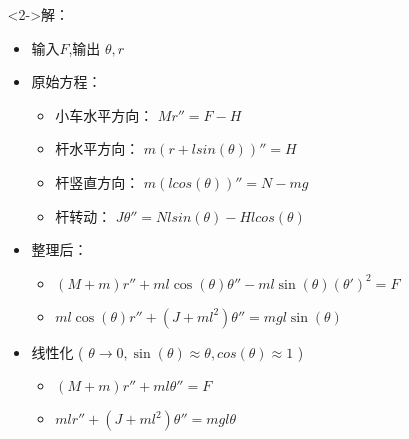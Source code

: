 \documentclass{beamer}
\begin{document}
\begin{frame}[t]
\begin{columns}
\begin{column}{0.23\textwidth}
\begin{block}
\end{block}
\end{column}
\begin{column}{0.77\textwidth}
\begin{block}<2->{解：}
\label{sec-5-1-2}


\begin{itemize}
\item 输入$F$,输出 $\theta,r$
\item 原始方程：
\begin{itemize}
\item 小车水平方向： $Mr''=F-H$
\item 杆水平方向： $m(r+l sin(\theta))'' = H$
\item 杆竖直方向： $m (l cos(\theta))'' = N-mg$
\item 杆转动： $J\theta''=N l sin(\theta) - H l cos(\theta)$
\end{itemize}
\item 整理后：
\begin{itemize}
\item $(M+m)r''+ml\cos(\theta)\theta''-ml\sin(\theta)(\theta')^2=F$
\item $ml\cos(\theta)r''+(J+m l^2)\theta''=mgl\sin(\theta)$
\end{itemize}
\item 线性化 ( $\theta\rightarrow 0,\sin(\theta)\approx \theta,cos(\theta)\approx 1$ )
\begin{itemize}
\item $(M+m)r''+ml\theta'' = F$
\item $ml r'' +(J+ml^2)\theta''=mgl\theta$
\end{itemize}
\end{itemize}
\end{block}
\end{column}
\end{columns}
\end{frame}
\end{document}
